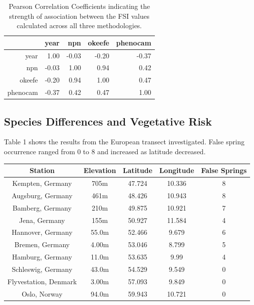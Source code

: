\documentclass{article}\usepackage[]{graphicx}\usepackage[]{color}
\begin{document}
\begin{table}[ht]
\centering
\caption{Pearson Correlation Coefficients indicating the strength of association between the FSI values calculated across all three methodologies.} 
\begin{tabular}{rrrrr}
  \hline
 & year & npn & okeefe & phenocam \\ 
  \hline
year & 1.00 & -0.03 & -0.20 & -0.37 \\ 
  npn & -0.03 & 1.00 & 0.94 & 0.42 \\ 
  okeefe & -0.20 & 0.94 & 1.00 & 0.47 \\ 
  phenocam & -0.37 & 0.42 & 0.47 & 1.00 \\ 
   \hline
\end{tabular}
\end{table}


\subsection*{Species Differences and Vegetative Risk}


Table 1 shows the results from the European transect investigated. False spring occurrence ranged from 0 to 8 and increased as latitude decreased. 

\begin{center}
 \label{tab:title} 
\begin{tabular}{c c c c c}
\hline
Station & Elevation & Latitude & Longitude & False Springs \\
\hline
Kempten, Germany & 705m & 47.724 & 10.336 & 8 \\
Augsburg, Germany & 461m & 48.426 & 10.943 & 8 \\
Bamberg, Germany & 210m & 49.875 & 10.921 & 7 \\
Jena, Germany & 155m & 50.927 & 11.584 & 4 \\
Hannover, Germany & 55.0m & 52.466 & 9.679 & 6 \\
Bremen, Germany & 4.00m & 53.046 & 8.799 & 5 \\
Hamburg, Germany & 11.0m & 53.635 & 9.99 & 4 \\
Schleswig, Germany & 43.0m & 54.529 & 9.549 & 0 \\
Flyvestation, Denmark & 3.00m & 57.093 & 9.849 & 0 \\
Oslo, Norway & 94.0m & 59.943 & 10.721 & 0 \\
\hline
\end{tabular}
\end{center}
\end{document}
